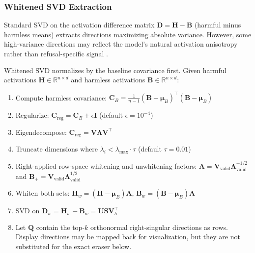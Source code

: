 \documentclass[11pt]{article}
\begin{document}
\subsubsection{Whitened SVD Extraction}
\label{sec:whitened_svd}

Standard SVD on the activation difference matrix $\mathbf{D} = \mathbf{H} - \mathbf{B}$ (harmful minus harmless means) extracts directions maximizing absolute variance. However, some high-variance directions may reflect the model's natural activation anisotropy rather than refusal-specific signal \citep{ethayarajh2019contextual}.

Whitened SVD normalizes by the baseline covariance first. Given harmful activations $\mathbf{H} \in \mathbb{R}^{n \times d}$ and harmless activations $\mathbf{B} \in \mathbb{R}^{n \times d}$:

\begin{enumerate}
    \item Compute harmless covariance: $\mathbf{C}_B = \frac{1}{n-1}(\mathbf{B} - \boldsymbol{\mu}_B)^\top(\mathbf{B} - \boldsymbol{\mu}_B)$
    \item Regularize: $\mathbf{C}_{\text{reg}} = \mathbf{C}_B + \epsilon \mathbf{I}$ \quad (default $\epsilon = 10^{-4}$)
    \item Eigendecompose: $\mathbf{C}_{\text{reg}} = \mathbf{V} \boldsymbol{\Lambda} \mathbf{V}^\top$
    \item Truncate dimensions where $\lambda_i < \lambda_{\max} \cdot \tau$ \quad (default $\tau = 0.01$)
    \item Right-applied row-space whitening and unwhitening factors: $\mathbf{A} = \mathbf{V}_{\text{valid}} \boldsymbol{\Lambda}_{\text{valid}}^{-1/2}$ and $\mathbf{B}_{+} = \mathbf{V}_{\text{valid}} \boldsymbol{\Lambda}_{\text{valid}}^{1/2}$
    \item Whiten both sets: $\mathbf{H}_w = (\mathbf{H} - \boldsymbol{\mu}_B)\mathbf{A}$, \quad $\mathbf{B}_w = (\mathbf{B} - \boldsymbol{\mu}_B)\mathbf{A}$
    \item SVD on $\mathbf{D}_w = \mathbf{H}_w - \mathbf{B}_w = \mathbf{U}\mathbf{S}\mathbf{V}_h^\top$
    \item Let $\mathbf{Q}$ contain the top-$k$ orthonormal right-singular directions as rows. Display directions may be mapped back for visualization, but they are not substituted for the exact eraser below.
\end{enumerate}
\end{document}
